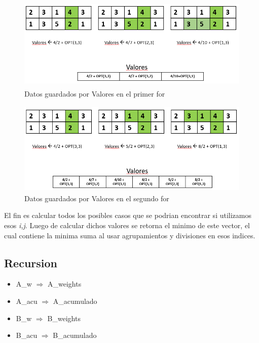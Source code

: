 \documentclass[12pt]{article}
\begin{document}
 \begin{figure}[h]
		 \centering
		 \includegraphics[width=40em, height=12em]{image/ejemplo2.PNG}
		 \caption{Datos guardados por Valores en el primer for}
 \end{figure}

 
 \begin{figure}[h]
		 \centering
		 \includegraphics[width=40em, height=12em]{image/ejemplo3.PNG}
		 \caption{Datos guardados por Valores en el segundo for}
 \end{figure}

 El fin es calcular todos los posibles casos que se podrian encontrar si utilizamos esos \textit{i,j}. Luego de calcular dichos valores se retorna el minimo de este vector, el cual contiene la minima suma al usar agrupamientos y divisiones en esos indices.


\subsection{Recursion}
 \begin{itemize}
		 \item A\_w $\Rightarrow$ A\_weights
		 \item A\_acu $\Rightarrow$ A\_acumulado
		 \item B\_w $\Rightarrow$ B\_weights
		 \item B\_acu $\Rightarrow$ B\_acumulado
 \end{itemize}
\end{document}

